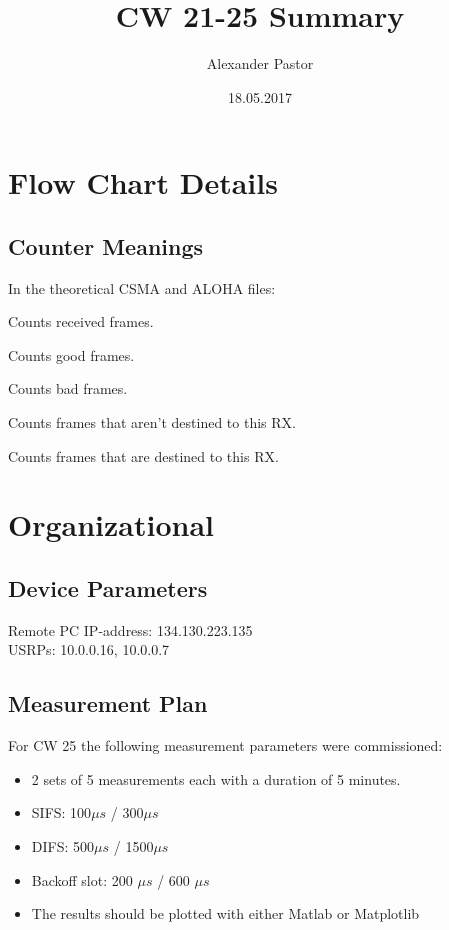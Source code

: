 \documentclass{article}
\begin{document}
	
\title{CW 21-25 Summary}
\author{Alexander Pastor}
\date{18.05.2017}
\maketitle
\tableofcontents
\newpage

\section{Flow Chart Details}
\subsection{Counter Meanings}

In the theoretical CSMA and ALOHA files:
\begin{description}[leftmargin=!]
	\item[Counter 1:] Counts received frames.
	\item[Counter 2:] Counts good frames.
	\item[Counter 3:] Counts bad frames.
	\item[Counter 4:] Counts frames that aren't destined to this RX.
	\item[Counter 5:] Counts frames that are destined to this RX.
\end{description}

\section{Organizational}

\subsection{Device Parameters}

Remote PC IP-address: 134.130.223.135 \\
USRPs: 10.0.0.16, 10.0.0.7

\subsection{Measurement Plan}

For CW 25 the following measurement parameters were commissioned:

\begin{itemize}
	\item 2 sets of 5 measurements each with a duration of 5 minutes.
	\item SIFS: 100$\mu s$ / 300$\mu s$ 
	\item DIFS: 500$\mu s$  / 1500$\mu s$ 
	\item Backoff slot: 200 $\mu s$ / 600 $\mu s$
	\item The results should be plotted with either Matlab or Matplotlib
\end{itemize}
\end{document}
